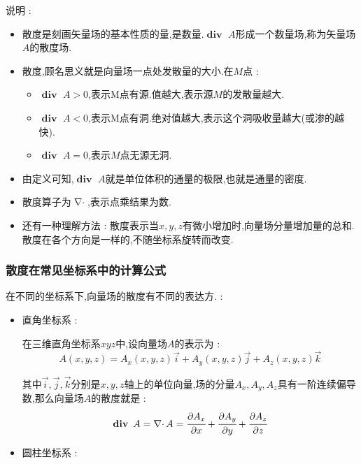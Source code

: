 \documentclass[UTF8,12pt]{ctexbook}
\newcommand{\partialDerivativeFrac}[2]{\cfrac{\partial #1}{\partial #2}}
\DeclareMathOperator{\divergenceText}{\mathbf{div}\ }
\DeclareMathOperator{\divergenceSymbol}{\nabla\cdot}
\begin{document}
{{{{{      说明 :
      \begin{itemize}
        \item {
              散度是刻画矢量场的基本性质的量,是数量.$\divergenceText A$形成一个数量场,称为矢量场$A$的散度场.
              }
        \item {
              散度,顾名思义就是向量场一点处发散量的大小.在$M$点 :
              \begin{itemize}
                \item $\divergenceText A > 0$,表示M点有源.值越大,表示源$M$的发散量越大.
                \item $\divergenceText A < 0$,表示M点有洞.绝对值越大,表示这个洞吸收量越大(或渗的越快).
                \item $\divergenceText A = 0$,表示$M$点无源无洞.
              \end{itemize}
              }
        \item {
              由定义可知,$\divergenceText A$就是单位体积的通量的极限,也就是通量的密度.
              }
        \item {
              散度算子为$\divergenceSymbol$,表示点乘结果为数.
              }
        \item {
              还有一种理解方法 : 散度表示当$x,y,z$有微小增加时,向量场分量增加量的总和.散度在各个方向是一样的,不随坐标系旋转而改变.
              }
      \end{itemize}
    }%

    \subsubsection{散度在常见坐标系中的计算公式}{
      在不同的坐标系下,向量场的散度有不同的表达方. :
      \begin{itemize}
        \item {
              直角坐标系 :

              在三维直角坐标系$xyz$中,设向量场$A$的表示为 :
              $$
                A(x,y,z) = A_x(x,y,z)\vec{i} + A_y(x,y,z)\vec{j} + A_z(x,y,z)\vec{k}
              $$

              其中$\vec{i},\vec{j},\vec{k}$分别是$x,y,z$轴上的单位向量,场的分量$A_x,A_y,A_z$具有一阶连续偏导数,那么向量场$A$的散度就是 :
              $$
                \divergenceText A = \divergenceSymbol A = \partialDerivativeFrac{A_x}{x} + \partialDerivativeFrac{A_y}{y} + \partialDerivativeFrac{A_z}{z}
              $$
              }
        \item {
              圆柱坐标系 :

}
\end{itemize}}}}}}
\end{document}
